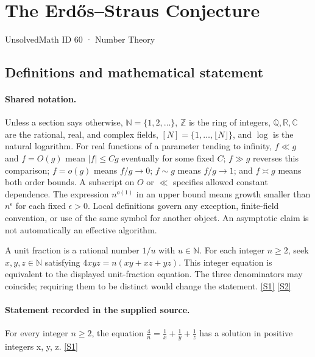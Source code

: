 \documentclass[11pt,a4paper]{article}
\newcommand{\N}{\mathbb{N}}
\newcommand{\Z}{\mathbb{Z}}
\newcommand{\Q}{\mathbb{Q}}
\newcommand{\R}{\mathbb{R}}
\newcommand{\C}{\mathbb{C}}
\newcommand{\sref}[2]{\hyperlink{source:#1:#2}{[S#2]}}
\begin{document}

\setcounter{section}{59}

\section{The Erdős--Straus Conjecture}\label{60}

{\small\sffamily UnsolvedMath ID 60 · Number Theory}

\subsection{Definitions and mathematical statement}

\paragraph{Shared notation.}Unless a section says otherwise, $\N=\{1,2,\ldots\}$,
$\Z$ is the ring of integers, $\Q,\R,\C$ are the rational, real, and complex
fields, $[N]=\{1,\ldots,\lfloor N\rfloor\}$, and $\log$ is the natural
logarithm. For real functions of a parameter tending to infinity,
$f\ll g$ and $f=O(g)$ mean $|f|\leq Cg$ eventually for some fixed $C$;
$f\gg g$ reverses this comparison; $f=o(g)$ means $f/g\to0$;
$f\sim g$ means $f/g\to1$; and $f\asymp g$ means both order bounds.
A subscript on $O$ or $\ll$ specifies allowed constant dependence.
The expression $n^{o(1)}$ in an upper bound means growth smaller than
$n^\epsilon$ for each fixed $\epsilon>0$. Local definitions govern any
exception, finite-field convention, or use of the same symbol for another
object. An asymptotic claim is not automatically an effective algorithm.



A unit fraction is a rational number $1/u$ with $u\in\N$. For each integer $n\geq2$, seek $x,y,z\in\N$ satisfying $4xyz=n(xy+xz+yz)$. This integer equation is equivalent to the displayed unit-fraction equation. The three denominators may coincide; requiring them to be distinct would change the statement. \sref{60}{1} \sref{60}{2}

\paragraph{Statement recorded in the supplied source.}
For every integer $n \geq 2$, the equation $\frac{4}{n} = \frac{1}{x} + \frac{1}{y} + \frac{1}{z}$ has a solution in positive integers x, y, z. \sref{60}{1}
\end{document}
